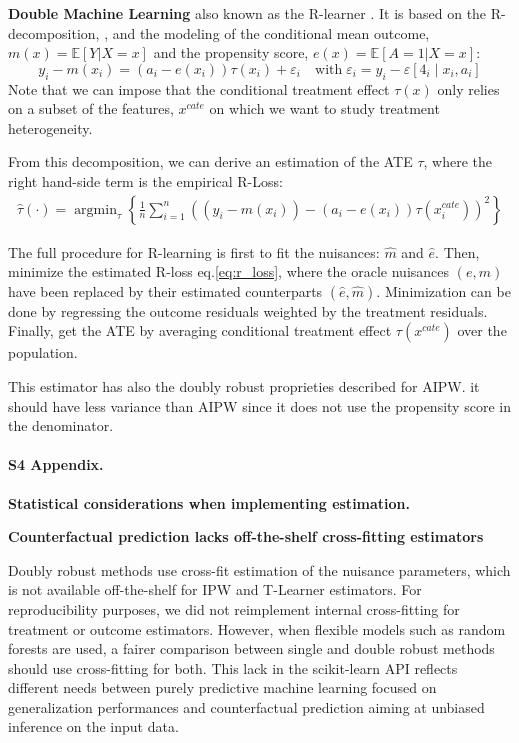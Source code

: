 \documentclass[10pt,letterpaper]{article}
\providecommand{\DIFaddbegin}{} %
\providecommand{\DIFaddend}{} %
\newcommand{\DIFaddincludegraphics}[2][]{{\color{blue}\fbox{\DIFOincludegraphics[#1]{#2}}}} %
\DeclareRobustCommand{\DIFaddbegin}{\DIFOaddbegin \let\includegraphics\DIFaddincludegraphics} %
\DeclareRobustCommand{\DIFaddend}{\DIFOaddend \let\includegraphics\DIFOincludegraphics} %
\begin{document}
\textbf{Double Machine Learning} \cite{chernozhukov2018double} also known
as the R-learner \cite{nie2021quasi}. It is based on the R-decomposition,
\cite{robinson1988root}, and the modeling of the conditional mean outcome,
$m(x)=\mathbb E[Y|X=x]$ and the propensity score, $e(x)=\mathbb E[A=1|X=x]$:
\begin{equation}\label{eq:r_decomposition}
  y_{i}-m\left(x_{i}\right)=\left(a_{i}-e\left(x_{i}\right)\right) \tau\left(x_{i}\right)+\varepsilon_{i} \quad \text{with} \; \varepsilon_{i}=y_{i}-\varepsilon\left[4_{i} \mid x_{i}, a_{i}\right]
\end{equation}
Note that we can impose that the conditional treatment effect $\tau(x)$ only
relies on a subset of the features, $x^{cate}$ on which we want to study
treatment heterogeneity.

From this decomposition, we can derive an estimation of the ATE $\tau$, where
the right hand-side term is the empirical R-Loss:
\begin{align}\label{eq:r_loss}
  \hat{\tau}(\cdot)=\operatorname{argmin}_{\tau}\left\{\frac{1}{n} \sum_{i=1}^{n}\left(\left(y_{i}-m\left(x_{i}\right)\right)-\left(a_{i}-e(x_{i})\right) \tau\left(x^{cate}_{i}\right)\right)^{2}\right\}
\end{align}

The full procedure for R-learning is first to fit the nuisances: $\hat m$ and
$\hat e$. Then, minimize the estimated R-loss eq.\ref{eq:r_loss}, where
the oracle nuisances $(e, m)$ have been replaced by their estimated
counterparts $(\hat e, \hat m)$. Minimization can be done by regressing
the outcome residuals weighted by the treatment residuals. Finally, get
the ATE by averaging conditional treatment effect $\tau(x^{cate})$ over
the population.

This estimator has also the doubly robust proprieties described for AIPW. it
should have less variance than AIPW since it does not use the propensity score
in the denominator.
\DIFaddbegin \clearpage
\DIFaddend


\paragraph*{S4 Appendix.}
\label{apd:statistical_considerations}
{\bf Statistical considerations when implementing
  estimation.}

\textbf{Counterfactual prediction lacks off-the-shelf cross-fitting estimators}

Doubly robust methods use cross-fit estimation of the nuisance parameters,
which is not available off-the-shelf for IPW and T-Learner estimators. For
reproducibility purposes, we did not reimplement internal cross-fitting for
treatment or outcome estimators. However, when flexible models such as
random forests are used, a fairer comparison between single and double
robust methods should use cross-fitting for both. This lack in the
scikit-learn API \cite{pedregosa2011scikit} reflects different needs
between purely predictive machine learning focused on generalization
performances and counterfactual prediction aiming at unbiased inference on
the input data.
\end{document}
